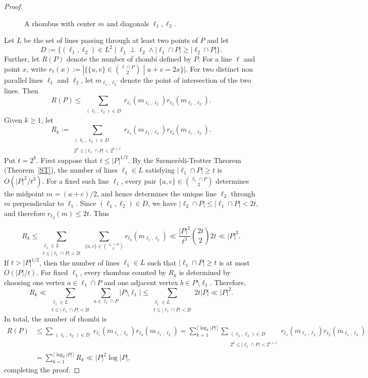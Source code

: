 \documentclass[11pt,oneside]{amsart}
\numberwithin{exercise}{subsection}
\begin{document}
\begin{proof}
\begin{figure}[h]
\begin{tikzpicture}[scale=1]
\end{tikzpicture}
\caption{A rhombus with center $m$ and diagonals $\ell_1,\ell_2$.}
\label{rhombusfigure}
\end{figure}
Let $L$ be the set of lines passing through at least two points of $P$ and let $$D:=\{(\ell_1,\ell_2)\in L^2\;|\;  \ell_1\perp \ell_2 \land |\ell_1\cap P|\geq |\ell_2\cap P|\}.$$
Further, let $R(P)$ denote the number of rhombi defined by $P$. For a line $\ell$ and point $x$, write $r_{\ell}(x):=|\{\{u,v\}\in \binom{\ell\cap P}{2}\;|\;u+v=2x\}|$. For two distinct non parallel lines $\ell_1$ and $\ell_2$, let $m_{\ell_1,\ell_2}$ denote the point of intersection of the two lines. Then
    $$R(P)\leq \sum_{\substack{(\ell_1,\ell_2)\in D }}r_{\ell_1}(m_{\ell_1,\ell_2})r_{\ell_2}(m_{\ell_1,\ell_2}).$$
Given $k\geq 1$, let $$R_k:=\sum_{\substack{(\ell_1,\ell_2)\in D\\  \\2^k\leq |\ell_1 \cap P|<2^{k+1}}}r_{\ell_1}(m_{\ell_1,\ell_2})r_{\ell_2}(m_{\ell_1,\ell_2}).$$
Put \(t=2^k\). First suppose that \(t\leq |P|^{1/2}\). By the Szemer\'{e}di-Trotter Theorem (Theorem~\ref{ST}), the number of lines \(\ell_1\in L\) satisfying
\(|\ell_1\cap P|\geq t\) is \(O(|P|^2/t^3)\). For a fixed such line
\(\ell_1\), every pair \(\{a,c\}\in \binom{\ell_1\cap P}{2}\)
determines the midpoint $m=(a+c)/2$, and hence determines the unique line \(\ell_2\) through \(m\) perpendicular
to \(\ell_1\). Since \((\ell_1,\ell_2)\in D\), we have $|\ell_2\cap P|\leq |\ell_1\cap P|<2t$, and therefore \(r_{\ell_2}(m)\leq 2t\). Thus



$$R_k\leq\sum_{\substack{\ell_1\in L\\ t\leq |\ell_1 \cap P|<2t}}\sum_{\{a,c\}\in{\binom{\ell_1\cap P}{2}}}r_{\ell_2}(m_{\ell_1,\ell_2})\ll \frac{|P|^2}{t^3} \binom{2t}{2}2t\ll |P|^2.$$
If $t> |P|^{1/2}$, then the number of lines $\ell_1\in L$ such that $|\ell_1\cap P|\geq t$ is at most $O(|P|/t)$. For fixed \(\ell_1\), every rhombus counted by \(R_k\) is determined by choosing one vertex
\(a\in \ell_1\cap P\) and one adjacent vertex
\(b\in P\setminus \ell_1\). Therefore,
$$R_k \ll\sum_{\substack{\ell_1\in L\\ t\leq |\ell_1 \cap P|<2t}}\sum_{a\in\ell_1\cap P}|P\setminus \ell_1|\leq \sum_{\substack{\ell_1\in L\\ t\leq |\ell_1 \cap P|<2t}} 2t |P|\ll |P|^2.$$
In total, the number of rhombi is 
\begin{align*}   
R(P)&\leq \sum_{\substack{(\ell_1,\ell_2)\in D }}r_{\ell_1}(m_{\ell_1,\ell_2})r_{\ell_2}(m_{\ell_1,\ell_2})
    =\sum_{k=1}^{\lceil \log_2|P| \rceil}\sum_{\substack{(\ell_1,\ell_2)\in D\\   \\2^k\leq |\ell_1 \cap P|<2^{k+1}}}r_{\ell_1}(m_{\ell_1,\ell_2})r_{\ell_2}(m_{\ell_1,\ell_2})  \\
    &=\sum_{k=1}^{\lceil \log_2|P| \rceil}R_k   
    \ll  |P|^2\log|P|,
    \end{align*}
completing the proof.
\end{proof}
\end{document}
